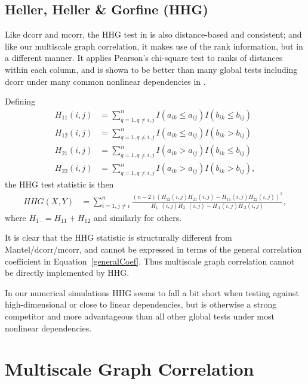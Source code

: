 \documentclass[11pt]{article}
\begin{document}
\subsection{Heller, Heller \& Gorfine (HHG)}
\label{appen:hhg}
Like dcorr and mcorr, the HHG test in \cite{HellerGorfine2013} is also distance-based and consistent; and like our multiscale graph correlation, it makes use of the rank information, but in a different manner. It applies Pearson's chi-square test to ranks of distances within each column, and is shown to be better than many global tests including dcorr under many common nonlinear dependencies in \cite{GorfineHellerHeller2012, HellerGorfine2013}. 

Defining 
\begin{align*}
H_{11}(i,j) &= \sum_{q=1,q\neq i,j}^{n}I(a_{ik} \leq a_{ij})I(b_{ik} \leq b_{ij}) \\
H_{12}(i,j) &= \sum_{q=1,q\neq i,j}^{n}I(a_{ik} \leq a_{ij})I(b_{ik} > b_{ij}) \\
H_{21}(i,j) &= \sum_{q=1,q\neq i,j}^{n}I(a_{ik} > a_{ij})I(b_{ik} \leq b_{ij}) \\
H_{22}(i,j) &= \sum_{q=1,q\neq i,j}^{n}I(a_{ik} > a_{ij})I(b_{ik} > b_{ij}),
\end{align*}
the HHG test statistic is then
\begin{align*}
HHG(X,Y) &= \sum_{i=1,j\neq i}^{n} \frac{(n-2)(H_{12}(i,j)H_{21}(i,j)-H_{11}(i,j)H_{22}(i,j))^2}{H_{1 \cdot}(i,j)H_{2 \cdot}(i,j)-H_{\cdot 1}(i,j)H_{\cdot 2}(i,j)},
\end{align*}
where $H_{1 \cdot}=H_{11}+H_{12}$ and similarly for others.

It is clear that the HHG statistic is structurally different from Mantel/dcorr/mcorr, and cannot be expressed in terms of the general correlation coefficient in Equation~\ref{generalCoef}. Thus multiscale graph correlation cannot be directly implemented by HHG.

In our numerical simulations HHG seems to fall a bit short when testing against high-dimensional or close to linear dependencies, but is otherwise a strong competitor and more advantageous than all other global tests under most nonlinear dependencies. %

\section{Multiscale Graph Correlation}
\label{appen:MGC}
\end{document}
